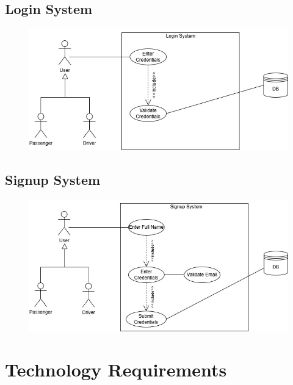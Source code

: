 \documentclass[a4paper,12pt]{article}
\begin{document}
  \subsection*{Login System}
    \begin{figure}[H]
      \centering
      \includegraphics[width=1\textwidth]{Login System.jpg} 
    \end{figure}
  \subsection*{Signup System}
    \begin{figure}[H]
      \centering
      \includegraphics[width=1\textwidth]{Signup System.jpg} 
    \end{figure}

\section{Technology Requirements}
\end{document}
